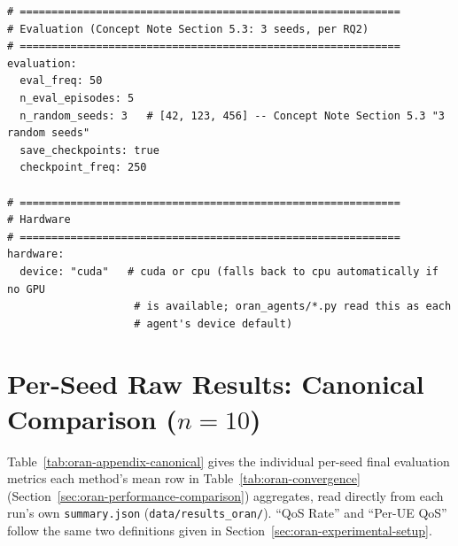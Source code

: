 {\begin{verbatim}
# ============================================================
# Evaluation (Concept Note Section 5.3: 3 seeds, per RQ2)
# ============================================================
evaluation:
  eval_freq: 50
  n_eval_episodes: 5
  n_random_seeds: 3   # [42, 123, 456] -- Concept Note Section 5.3 "3 random seeds"
  save_checkpoints: true
  checkpoint_freq: 250

# ============================================================
# Hardware
# ============================================================
hardware:
  device: "cuda"   # cuda or cpu (falls back to cpu automatically if no GPU
                    # is available; oran_agents/*.py read this as each
                    # agent's device default)
\end{verbatim}
}

\section{Per-Seed Raw Results: Canonical Comparison (\texorpdfstring{$n=10$}{n=10})}
\label{sec:oran-appendix-perseed-canonical}

Table~\ref{tab:oran-appendix-canonical} gives the individual per-seed final
evaluation metrics each method's mean row in
Table~\ref{tab:oran-convergence} (Section~\ref{sec:oran-performance-comparison})
aggregates, read directly from each run's own
\texttt{summary.json} (\texttt{data/results\_oran/}). ``QoS Rate'' and
``Per-UE QoS'' follow the same two definitions given in
Section~\ref{sec:oran-experimental-setup}.

